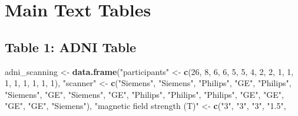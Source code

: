 \documentclass[
]{article}
\newenvironment{Shaded}{\begin{snugshade}}{\end{snugshade}}
\newcommand{\DecValTok}[1]{\textcolor[rgb]{0.00,0.00,0.81}{#1}}
\newcommand{\KeywordTok}[1]{\textcolor[rgb]{0.13,0.29,0.53}{\textbf{#1}}}
\newcommand{\NormalTok}[1]{#1}
\newcommand{\StringTok}[1]{\textcolor[rgb]{0.31,0.60,0.02}{#1}}
\begin{document}
\hypertarget{main-text-tables}{%
\section{Main Text Tables}\label{main-text-tables}}

\hypertarget{table-1-adni-table}{%
\subsection{Table 1: ADNI Table}\label{table-1-adni-table}}

\begin{Shaded}
\begin{Highlighting}[]
\NormalTok{adni_scanning <-}\StringTok{ }\KeywordTok{data.frame}\NormalTok{(}\StringTok{"participants"}\NormalTok{ <-}\StringTok{ }\KeywordTok{c}\NormalTok{(}\DecValTok{26}\NormalTok{, }\DecValTok{8}\NormalTok{, }\DecValTok{6}\NormalTok{, }\DecValTok{6}\NormalTok{, }
                                                \DecValTok{5}\NormalTok{, }\DecValTok{5}\NormalTok{, }\DecValTok{4}\NormalTok{, }\DecValTok{2}\NormalTok{,}
                                                \DecValTok{2}\NormalTok{, }\DecValTok{1}\NormalTok{, }\DecValTok{1}\NormalTok{, }\DecValTok{1}\NormalTok{,}
                                                \DecValTok{1}\NormalTok{, }\DecValTok{1}\NormalTok{, }\DecValTok{1}\NormalTok{, }\DecValTok{1}\NormalTok{,}
                                                \DecValTok{1}\NormalTok{),}
                               \StringTok{"scanner"}\NormalTok{ <-}\StringTok{ }\KeywordTok{c}\NormalTok{(}\StringTok{"Siemens"}\NormalTok{, }\StringTok{"Siemens"}\NormalTok{, }\StringTok{"Philips"}\NormalTok{, }\StringTok{"GE"}\NormalTok{,}
                                              \StringTok{"Philips"}\NormalTok{, }\StringTok{"Siemens"}\NormalTok{, }\StringTok{"GE"}\NormalTok{, }\StringTok{"Siemens"}\NormalTok{,}
                                              \StringTok{"GE"}\NormalTok{, }\StringTok{"Philips"}\NormalTok{, }\StringTok{"Philips"}\NormalTok{, }\StringTok{"Philips"}\NormalTok{,}
                                              \StringTok{"GE"}\NormalTok{, }\StringTok{"GE"}\NormalTok{, }\StringTok{"GE"}\NormalTok{, }\StringTok{"GE"}\NormalTok{,}
                                              \StringTok{"Siemens"}\NormalTok{),}
                               \StringTok{"magnetic field strength (T)"}\NormalTok{ <-}\StringTok{ }\KeywordTok{c}\NormalTok{(}\StringTok{"3"}\NormalTok{, }\StringTok{"3"}\NormalTok{, }\StringTok{"3"}\NormalTok{, }\StringTok{"1.5"}\NormalTok{,}

\end{Highlighting}
\end{Shaded}
\end{document}
